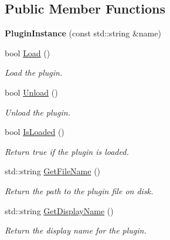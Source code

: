 \subsection*{Public Member Functions}
\begin{DoxyCompactItemize}
\item 
\mbox{\label{class_plugin_instance_a07bf9ea0de251fd6435c8744cc1e90ec}} 
{\bfseries Plugin\+Instance} (const std\+::string \&name)
\item 
\mbox{\label{class_plugin_instance_a1323b013242884d9537f9e1f04b2b108}} 
bool \hyperlink{class_plugin_instance_a1323b013242884d9537f9e1f04b2b108}{Load} ()
\begin{DoxyCompactList}\small\item\em Load the plugin. \end{DoxyCompactList}\item 
\mbox{\label{class_plugin_instance_aab005c3fdaa2fc27e75fb71b5de6671c}} 
bool \hyperlink{class_plugin_instance_aab005c3fdaa2fc27e75fb71b5de6671c}{Unload} ()
\begin{DoxyCompactList}\small\item\em Unload the plugin. \end{DoxyCompactList}\item 
\mbox{\label{class_plugin_instance_ad1ba2711ffe606b85540ff24e4fe6f03}} 
bool \hyperlink{class_plugin_instance_ad1ba2711ffe606b85540ff24e4fe6f03}{Is\+Loaded} ()
\begin{DoxyCompactList}\small\item\em Return true if the plugin is loaded. \end{DoxyCompactList}\item 
\mbox{\label{class_plugin_instance_a8236f5136a747e8ff9f5e122fbb13033}} 
std\+::string \hyperlink{class_plugin_instance_a8236f5136a747e8ff9f5e122fbb13033}{Get\+File\+Name} ()
\begin{DoxyCompactList}\small\item\em Return the path to the plugin file on disk. \end{DoxyCompactList}\item 
\mbox{\label{class_plugin_instance_a7a1964ff60e001535bae1e4bdcbfe62f}} 
std\+::string \hyperlink{class_plugin_instance_a7a1964ff60e001535bae1e4bdcbfe62f}{Get\+Display\+Name} ()
\begin{DoxyCompactList}\small\item\em Return the display name for the plugin. \end{DoxyCompactList}\end{DoxyCompactItemize}
